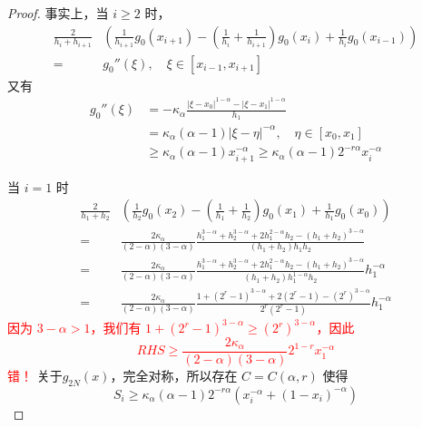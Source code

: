 \documentclass{ctexart}
\theoremstyle{definition}
\theoremstyle{remark}
\numberwithin{equation}{section}
\begin{document}
\begin{proof}
    事实上，当 \(i\ge 2\) 时，
    \begin{equation}
        \begin{aligned}
            \frac{2}{h_i + h_{i+1}} & \left( \frac{1}{h_{i+1}} g_0(x_{i+1}) - (\frac{1}{h_{i}}+\frac{1}{h_{i+1}})g_0(x_{i}) + \frac{1}{h_{i}} g_0(x_{i-1}) \right) \\
            =                       & g_0''(\xi), \quad \xi \in [x_{i-1}, x_{i+1}]
        \end{aligned}
    \end{equation}
    又有
    \begin{equation}
        \begin{aligned}
            g_0''(\xi) & =  -\kappa_\alpha \frac{|\xi-x_0|^{1-\alpha} - |\xi-x_1|^{1-\alpha}}{h_1}                        \\
                       & = \kappa_\alpha(\alpha-1)|\xi-\eta|^{-\alpha} , \quad \eta\in [x_0, x_1]                       \\
                       & \ge \kappa_\alpha(\alpha-1) x_{i+1}^{-\alpha}  \ge \kappa_\alpha(\alpha-1) 2^{-r\alpha} x_{i}^{-\alpha}
        \end{aligned}
    \end{equation}

    当 \(i=1\) 时
    \begin{equation}
        \begin{aligned}
            \frac{2}{h_{1} + h_{2}} & \left( \frac{1}{h_{2}} g_0(x_{2}) - (\frac{1}{h_{1}}+\frac{1}{h_{2}})g_0(x_{1}) + \frac{1}{h_{1}} g_0(x_{0}) \right)                                                  \\
            =                       & \frac{2\kappa_\alpha}{(2-\alpha)(3-\alpha)} \frac{h_1^{3-\alpha}+h_2^{3-\alpha} + 2h_1^{2-\alpha}h_2 - (h_1+h_2)^{3-\alpha} }{(h_{1} + h_{2})h_1 h_2}                          \\
            =                       & \frac{2\kappa_\alpha}{(2-\alpha)(3-\alpha)} \frac{h_1^{3-\alpha}+h_2^{3-\alpha} + 2h_1^{2-\alpha}h_2 - (h_1+h_2)^{3-\alpha} }{(h_{1} + h_{2})h_1^{1-\alpha} h_2} h_1^{-\alpha} \\
            =                       & \frac{2\kappa_\alpha}{(2-\alpha)(3-\alpha)} \frac{1+(2^r-1)^{3-\alpha} + 2(2^r-1) - (2^r)^{3-\alpha} }{2^r (2^r-1)} h_1^{-\alpha}
        \end{aligned}
    \end{equation}
    \textcolor{red}{因为 \(3-\alpha > 1\)，我们有 \(1+(2^r-1)^{3-\alpha} \ge (2^r)^{3-\alpha}\)，因此
    \begin{equation}
        RHS \ge \frac{2\kappa_\alpha}{(2-\alpha)(3-\alpha)} 2^{1-r} x_1^{-\alpha}
    \end{equation}
    错！}
    关于\(g_{2N}(x)\)，完全对称，所以存在 \(C=C(\alpha,r)\) 使得
    \begin{equation}
        S_i \ge \kappa_\alpha(\alpha-1) 2^{-r\alpha} (x_i^{-\alpha} + (1-x_i)^{-\alpha})
    \end{equation}
\end{proof}
\end{document}
